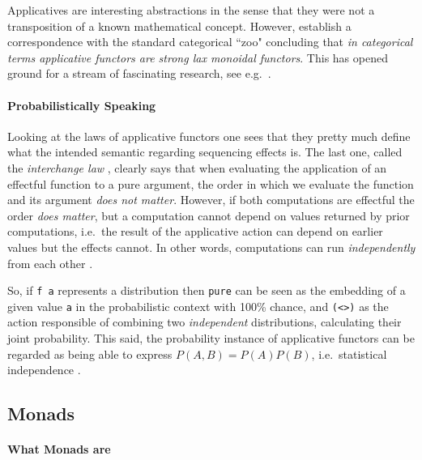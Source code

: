 \documentclass[
  oneside,
  11pt, a4paper,
  footinclude=true,
  headinclude=true,
  cleardoublepage=empty
]{scrbook}
\theoremstyle{definition}
\theoremstyle{definition}
\begin{document}
	Applicatives are interesting abstractions in the sense that they were not a transposition of a known mathematical concept. However, \cite{mcbride2008applicative} establish a correspondence with the standard categorical ``zoo" concluding that \emph{in categorical terms applicative functors are strong lax monoidal functors}. This has opened ground for a stream of fascinating research, see e.g.\ \citep{Paterson:2012:CAF:2368298.2368321, Cooper:2008:EFA:1485346.1485361, DBLP:journals/corr/CapriottiK14}.
	        
         \paragraph{Probabilistically Speaking}
	            
	Looking at the laws of applicative functors one sees that they pretty much define what the intended semantic regarding sequencing effects is. The last one, called the \emph{interchange law} \citep{mcbride2008applicative}, clearly says that when evaluating the application of an effectful function to a pure argument, the order in which we evaluate the function and its argument \emph{does not matter}. However, if both computations are effectful the order \emph{does matter}, but a computation cannot depend on values returned by prior computations, i.e.\ the result of the applicative action can depend on earlier values but the effects cannot. In other words, computations can run \emph{independently} from each other \citep{Cooper:2008:EFA:1485346.1485361, Marlow:2014:NFA:2692915.2628144, Marlow:2016:DHD:3241625.2976007, andrey2019selective}.
	            
	So, if \texttt{f a} represents a distribution then \texttt{pure} can be seen as the embedding of a given value \texttt{a} in the probabilistic context with 100\% chance, and \texttt{(\textless*\textgreater)} as the action responsible of combining two \emph{independent} distributions, calculating their joint probability. This said, the probability instance of applicative functors can be regarded as being able to express $P(A, B) = P(A)P(B)$, i.e.\ statistical independence \citep{jtobin}.
	    
	    \subsection{Monads}
	    
	        \paragraph{What Monads are}
	        
\end{document}
